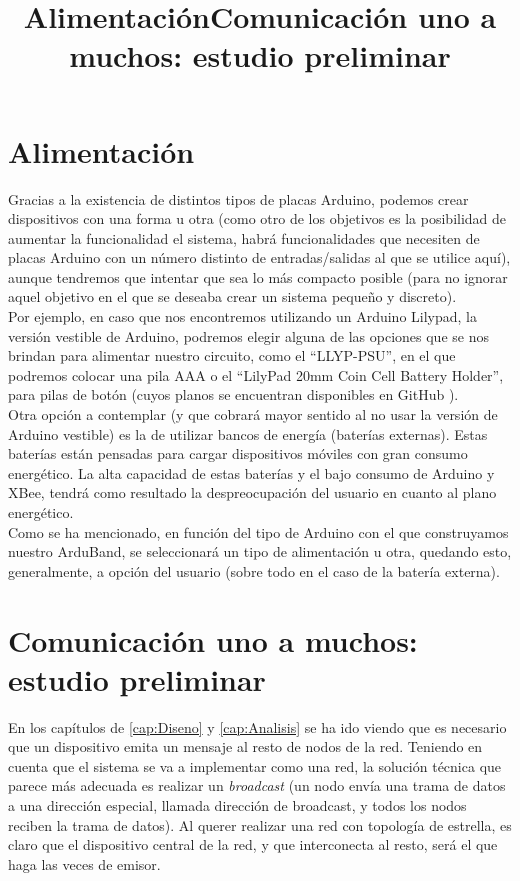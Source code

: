 \section{Alimentación}
\title{Alimentación}

Gracias a la existencia de distintos tipos de placas Arduino, podemos crear dispositivos
con una forma u otra (como otro de los objetivos es la posibilidad de aumentar la funcionalidad
el sistema, habrá funcionalidades que necesiten de placas Arduino con un número distinto de
entradas/salidas al que se utilice aquí), aunque tendremos que intentar que sea lo más compacto
posible (para no ignorar aquel objetivo en el que se deseaba crear un sistema pequeño y discreto).\\

Por ejemplo, en caso que nos encontremos utilizando un Arduino Lilypad, la versión vestible de Arduino,
podremos elegir alguna de las opciones que se nos brindan para alimentar nuestro circuito, como el “LLYP-PSU”,
en el que podremos colocar una pila AAA o el “LilyPad 20mm Coin Cell Battery Holder”, para pilas de botón (cuyos
planos se encuentran disponibles en GitHub \cite{lilypadcoin}).\\

Otra opción a contemplar (y que cobrará mayor sentido al no usar la versión de Arduino vestible)
es la de utilizar bancos de energía (baterías externas). Estas baterías están pensadas para cargar
dispositivos móviles con gran consumo energético. La alta capacidad de estas baterías y el bajo consumo
de Arduino y XBee, tendrá como resultado la despreocupación del usuario en cuanto al plano energético.\\

Como se ha mencionado, en función del tipo de Arduino con el que construyamos nuestro ArduBand,
se seleccionará un tipo de alimentación u otra, quedando esto, generalmente, a opción del usuario
(sobre todo en el caso de la batería externa).\\

\section{Comunicación uno a muchos: estudio preliminar}
\title{Comunicación uno a muchos: estudio preliminar}

En los capítulos de \ref{cap:Diseno} y \ref{cap:Analisis} se ha ido viendo que es necesario
que un dispositivo emita un mensaje al resto de nodos de la red. Teniendo en cuenta que el
sistema se va a implementar como una red, la solución técnica que parece más adecuada
es realizar un \textit{broadcast} (un nodo envía una trama de datos a una dirección
especial, llamada dirección de broadcast, y todos los nodos reciben la trama de datos). Al querer
realizar una red con topología de estrella, es claro que el dispositivo central de
la red, y que interconecta al resto, será el que haga las veces de emisor.\\

